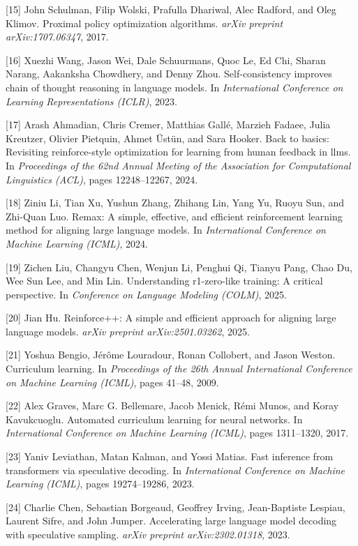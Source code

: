 \documentclass{article}
\begin{document}
[15] John Schulman, Filip Wolski, Prafulla Dhariwal, Alec Radford,
and Oleg Klimov. Proximal policy optimization algorithms.
\textit{arXiv preprint arXiv:1707.06347}, 2017.

[16] Xuezhi Wang, Jason Wei, Dale Schuurmans, Quoc Le, Ed Chi,
Sharan Narang, Aakanksha Chowdhery, and Denny Zhou.
Self-consistency improves chain of thought reasoning in language
models. In \textit{International Conference on Learning
Representations (ICLR)}, 2023.

[17] Arash Ahmadian, Chris Cremer, Matthias Gall\'e, Marzieh
Fadaee, Julia Kreutzer, Olivier Pietquin, Ahmet \"Ust\"un, and
Sara Hooker. Back to basics: Revisiting reinforce-style
optimization for learning from human feedback in llms. In
\textit{Proceedings of the 62nd Annual Meeting of the Association
for Computational Linguistics (ACL)}, pages 12248--12267, 2024.

[18] Ziniu Li, Tian Xu, Yushun Zhang, Zhihang Lin, Yang Yu,
Ruoyu Sun, and Zhi-Quan Luo. Remax: A simple, effective, and
efficient reinforcement learning method for aligning large
language models. In \textit{International Conference on Machine
Learning (ICML)}, 2024.

[19] Zichen Liu, Changyu Chen, Wenjun Li, Penghui Qi, Tianyu
Pang, Chao Du, Wee Sun Lee, and Min Lin. Understanding
r1-zero-like training: A critical perspective. In
\textit{Conference on Language Modeling (COLM)}, 2025.

[20] Jian Hu. Reinforce++: A simple and efficient approach for
aligning large language models.
\textit{arXiv preprint arXiv:2501.03262}, 2025.

[21] Yoshua Bengio, J\'er\^ome Louradour, Ronan Collobert, and
Jason Weston. Curriculum learning. In \textit{Proceedings of the
26th Annual International Conference on Machine Learning (ICML)},
pages 41--48, 2009.

[22] Alex Graves, Marc G. Bellemare, Jacob Menick, R\'emi Munos,
and Koray Kavukcuoglu. Automated curriculum learning for neural
networks. In \textit{International Conference on Machine Learning
(ICML)}, pages 1311--1320, 2017.

[23] Yaniv Leviathan, Matan Kalman, and Yossi Matias. Fast
inference from transformers via speculative decoding. In
\textit{International Conference on Machine Learning (ICML)},
pages 19274--19286, 2023.

[24] Charlie Chen, Sebastian Borgeaud, Geoffrey Irving,
Jean-Baptiste Lespiau, Laurent Sifre, and John Jumper.
Accelerating large language model decoding with speculative
sampling. \textit{arXiv preprint arXiv:2302.01318}, 2023.
\end{document}
